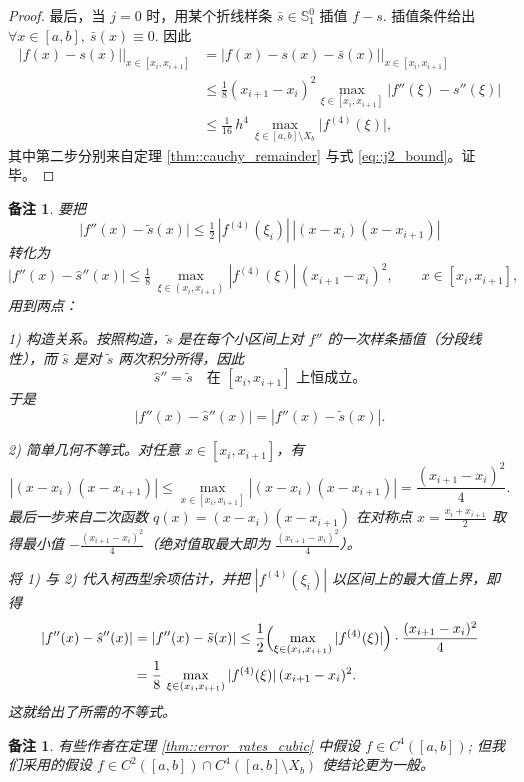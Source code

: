 \documentclass[a4paper]{ctexart}
\newtheorem{remark}{备注}
\newtheorem*{remark*}{备注}
\numberwithin{theorem}{section}
\numberwithin{equation}{section}
\numberwithin{figure}{section}
\numberwithin{remark}{section}
\begin{document}
\begin{proof}
最后，当 $j=0$ 时，用某个折线样条 $\bar{s}\in\mathbb{S}_1^{0}$ 插值 $f-s$. 
插值条件给出
$\forall x\in[a,b],\ \bar{s}(x)\equiv 0$. 因此
\begin{align*}
\bigl|f(x)-s(x)\bigr|\big|_{x\in[x_i,x_{i+1}]}
&=\bigl|f(x)-s(x)-\bar{s}(x)\bigr|\big|_{x\in[x_i,x_{i+1}]}\nonumber\\
&\le \frac{1}{8}(x_{i+1}-x_i)^2
\max_{\xi\in[x_i,x_{i+1}]}\bigl|f''(\xi)-s''(\xi)\bigr| \nonumber\\
&\le \frac{1}{16}\,h^{4}\,
\max_{\xi\in[a,b]\setminus X_b}\bigl|f^{(4)}(\xi)\bigr|,
\end{align*}
其中第二步分别来自定理 \ref{thm::cauchy_remainder} 
与式 \eqref{eq::j2_bound}。证毕。
\end{proof}

\begin{remark*}
    要把
\[
\bigl|f''(x)-\tilde{s}(x)\bigr|
\le \tfrac12\,|f^{(4)}(\xi_i)|\,|(x-x_i)(x-x_{i+1})|
\]
转化为
\[
\bigl|f''(x)-\hat{s}''(x)\bigr|
\le \tfrac18\,
\max_{\xi\in(x_i,x_{i+1})}|f^{(4)}(\xi)|\,(x_{i+1}-x_i)^2,
\qquad x\in[x_i,x_{i+1}],
\]
用到两点：

1) 构造关系。按照构造，$\tilde{s}$ 是在每个小区间上对 $f''$ 的一次样条插值（分段线性），而 $\hat{s}$ 是对 $\tilde{s}$ 两次积分所得，因此
\[
\hat{s}''=\tilde{s}\quad\text{在 }[x_i,x_{i+1}] \text{ 上恒成立。}
\]
于是
\[
|f''(x)-\hat{s}''(x)|=|f''(x)-\tilde{s}(x)|.
\]

2) 简单几何不等式。对任意 $x\in[x_i,x_{i+1}]$，有
\[
|(x-x_i)(x-x_{i+1})|
\le \max_{x\in[x_i,x_{i+1}]}|(x-x_i)(x-x_{i+1})|
=\frac{(x_{i+1}-x_i)^2}{4}.
\]
最后一步来自二次函数
$q(x)=(x-x_i)(x-x_{i+1})$
在对称点 $x=\tfrac{x_i+x_{i+1}}{2}$ 取得最小值 $-\tfrac{(x_{i+1}-x_i)^2}{4}$（绝对值取最大即为 $\tfrac{(x_{i+1}-x_i)^2}{4}$）。

将 1) 与 2) 代入柯西型余项估计，并把 $|f^{(4)}(\xi_i)|$ 以区间上的最大值上界，即得
\[
\begin{aligned}
|f''(x)-\hat{s}''(x)|
&=|f''(x)-\tilde{s}(x)|
\le \frac12
\Bigl(\max_{\xi\in(x_i,x_{i+1})}|f^{(4)}(\xi)|\Bigr)
\cdot \frac{(x_{i+1}-x_i)^2}{4} \\
&=\frac18\,\max_{\xi\in(x_i,x_{i+1})}|f^{(4)}(\xi)|\,(x_{i+1}-x_i)^2.
\end{aligned}
\]
这就给出了所需的不等式。
\end{remark*}

\begin{remark}
    \label{rem::assumption_c4_general}
有些作者在定理 \ref{thm::error_rates_cubic} 中假设 $f\in C^{4}([a,b])$; 
但我们采用的假设 $f\in C^{2}([a,b])\cap C^{4}([a,b]\setminus X_b)$ 
使结论更为一般。
\end{remark}
\end{document}
